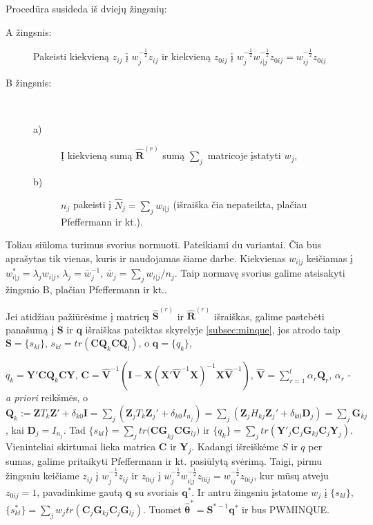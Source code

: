 \documentclass[11pt,a4paper]{article}
\begin{document}
Procedūra susideda iš dviejų žingsnių:
\begin{description}
\item[A žingsnis:] Pakeisti kiekvieną $z_{ij}$ į $w_j^{-\frac{1}{2}}z_{ij}$ ir kiekvieną $z_{0ij}$ į $w_j^{-\frac{1}{2}}w_{i|j}^{-\frac{1}{2}}z_{0ij}=w_{ij}^{-\frac{1}{2}}z_{0ij}$
\item[B žingsnis:] \ 
\begin{description}
\item[a)] Į kiekvieną sumą $\hat{\mathbf{R}}^{(r)}$ sumą $\sum_j$  matricoje įstatyti $w_j$,
\item[b)] $n_j$ pakeisti į $\hat{N}_j=\sum_jw_{i|j}$ (išraiška čia nepateikta, plačiau  Pfeffermann ir kt.\cite{pfeff}).
\end{description}
\end{description}

\indent Toliau siūloma turimus svorius normuoti. Pateikiami du variantai. Čia bus aprašytas tik vienas, kuris ir naudojamas šiame darbe.  Kiekvienas $w_{i|j}$ keičiamas į $w_{i|j}^*=\lambda_jw_{i|j}$, $\lambda_j=\bar{w}_j^{-1}$, $\bar{w}_j=\sum_jw_{i|j}/n_j$. Taip normavę svorius galime atsisakyti žingsnio B, plačiau Pfeffermann ir kt.\cite{pfeff}.

\indent Jei atidžiau pažiūrėsime į matricų $\hat{\mathbf{S}}^{(r)}$ ir $\hat{\mathbf{R}}^{(r)}$ išraiškas, galime pastebėti panašumą į $\mathbf{S}$ ir $\mathbf{q}$ išraiškas pateiktas skyrelyje \ref{subsec:minque}, jos atrodo taip $\mathbf{S}=\{s_{kl}\}$, $s_{kl}=tr(\mathbf{CQ}_k\mathbf{CQ}_l)$, o
$\mathbf{q}=\{q_k\}$,

\noindent $q_k=\mathbf{Y'CQ}_k\mathbf{CY}$, $\mathbf{C} = \mathbf{\hat{V}}^{-1}\left(\mathbf{I}-\mathbf{X}\left(\mathbf{X' \hat{V}}^{-1}\mathbf{X}\right)^{-1}\mathbf{X \hat{V}}^{-1}\right)$, $\mathbf{\hat{V}}=\sum^l_{r=1}\alpha_r\mathbf{Q}_r$, $\alpha_r$ - \textit{a priori} reikšmės, o $\mathbf{Q}_k:= \mathbf{Z}T_k\mathbf{Z'}+\delta_{k0}\mathbf{I}=\sum_j(\mathbf{Z}_jT_k\mathbf{Z}_j'+\delta_{k0}I_{n_j})=\sum_j(\mathbf{Z}_jH_{kj}\mathbf{Z}_j'+ \delta_{k0}\mathbf{D}_j)=\sum_j\mathbf{G}_{kj}$, kai $\mathbf{D}_j=I_{n_j}$. Tad $\{s_{kl}\}=\sum_jtr\mathbf{(CG}_{kj}\mathbf{CG}_{lj})$ ir $\{q_k\}=\sum_jtr(\mathbf{Y}'_j\mathbf{C}_j\mathbf{G}_{kj}\mathbf{C}_j\mathbf{Y}_j)$. Vieninteliai skirtumai lieka matrica $\mathbf{C}$ ir $\mathbf{Y}_j$. Kadangi išreiškėme $S$ ir $q$ per sumas, galime pritaikyti  Pfeffermann ir kt.\cite{pfeff} pasiūlytą svėrimą. Taigi, pirmu žingsniu keičiame $z_{ij}$ į $w_j^{-\frac{1}{2}}z_{ij}$ ir $z_{0ij}$ į $w_j^{-\frac{1}{2}}w_{i|j}^{-\frac{1}{2}}z_{0ij}=w_{ij}^{-\frac{1}{2}}z_{0ij}$, kur mūsų atveju $z_{0ij}=1$, pavadinkime gautą $\mathbf{q}$ su svoriais $\mathbf{q}^*$. Ir antru žingsniu įstatome $w_j$ į $\{s_{kl}\}$, $\{s^*_{kl}\}=\sum_jw_jtr(\mathbf{C}_j\mathbf{G}_{kj}\mathbf{C}_j\mathbf{G}_{lj})$. Tuomet $\hat{\boldsymbol{\theta}}^*=\mathbf{S}^{*-1}\mathbf{q}^*$ ir bus PWMINQUE.
\end{document}

